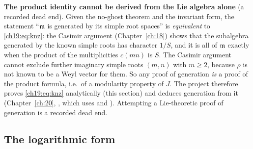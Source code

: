 \begin{warning}
\textbf{The product identity cannot be derived from the Lie algebra alone} (a recorded dead end).  Given the no-ghost theorem and the invariant form, the statement ``$\mathfrak{m}$ is generated by its simple
root spaces'' is \emph{equivalent} to \eqref{ch19:eq:knz}: the Casimir argument (Chapter~\ref{ch:18}) shows that the
subalgebra generated by the known simple roots has character $1/S$, and it is all of $\mathfrak{m}$ exactly when the product
of the multiplicities $c(mn)$ is $S$.  The Casimir argument cannot exclude further imaginary simple roots $(m,n)$ with
$m\ge2$, because $\rho$ is not known to be a Weyl vector for them.  So any proof of generation \emph{is} a proof of the
product formula, i.e.\ of a modularity property of $J$.  The project therefore proves \eqref{ch19:eq:knz} analytically
(this section) and deduces generation from it (Chapter~\ref{ch:20}, , which uses
 and ).  Attempting a Lie-theoretic proof of generation is a recorded
dead end.
\end{warning}

\subsection{The logarithmic form}

